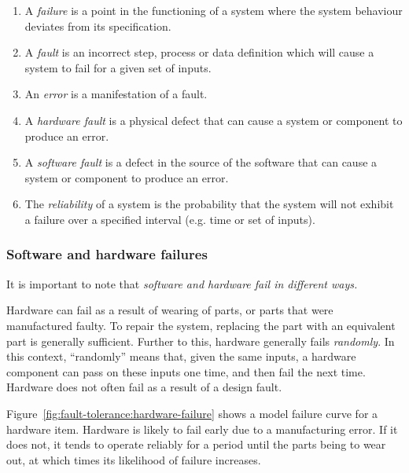 \begin{enumerate}

\item A \emph{failure} is a point in the functioning of a system where the
system behaviour deviates from its specification.

\item A \emph{fault} is an incorrect step, process or data definition which
will cause a system to fail for a given set of inputs.

\item An \emph{error} is a manifestation of a fault.

\item A \emph{hardware fault} is a physical defect that can cause a system or component to produce an error.

\item A \emph{software fault} is a defect in the source of the software that can cause a system or component to produce an error.

\item The \emph{reliability} of a system is the probability that the system will not exhibit a failure over a specified interval (e.g. time or set of inputs).

\end{enumerate}

\subsubsection*{Software and hardware failures}

It is important to note that \emph{software and hardware fail in different ways.}

Hardware can fail as a result of wearing of parts, or parts that were manufactured faulty. To repair the system, replacing the part with an equivalent part is generally sufficient. Further to this, hardware generally fails \emph{randomly}. In this context, ``randomly'' means that, given the same inputs, a hardware component can pass on these inputs one time, and then fail the next time. Hardware does not often fail as a result of a design fault.

Figure~\ref{fig:fault-tolerance:hardware-failure} shows a model failure curve for a hardware item. Hardware is likely to fail early due to a manufacturing error. If it does not, it tends to operate reliably for a period until the parts being to wear out, at which times its likelihood of failure increases.

